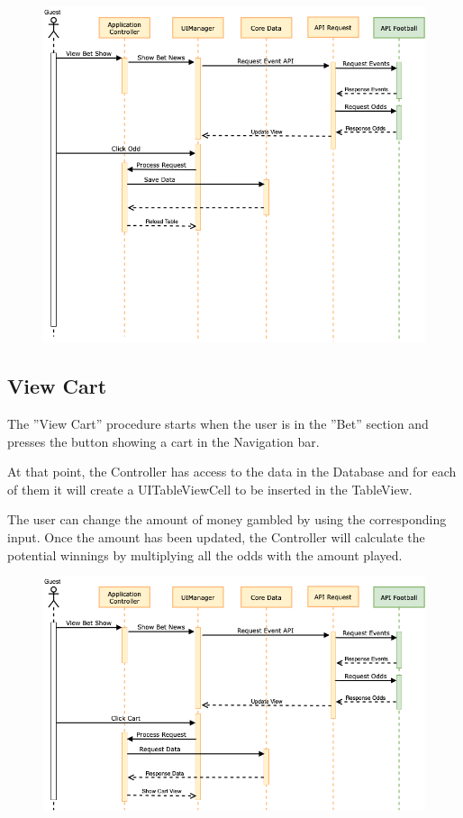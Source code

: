 \documentclass[numbers=noenddot, 12pt, a4paper, oneside]{scrbook}
\begin{document}
\begin{figure}[H]
	\centering
	\includegraphics[width=1\textwidth]{images/Sequence/SequenceAddOdd}
\end{figure}
\newpage
\subsection*{View Cart}
The ”View Cart” procedure starts when the user is in the ”Bet” section and presses the button showing a cart in the Navigation bar.

At  that point, the Controller has access to the data in the Database and for each of them  it will create a UITableViewCell to be inserted in the TableView.

The user can change the amount of money gambled  by using the corresponding  input.  Once the amount has been updated, the Controller will calculate the potential winnings by multiplying all the odds with the amount played.

\begin{figure}[H]
	\centering
	\includegraphics[width=1\textwidth]{images/Sequence/SequenceViewCart}
\end{figure}
\newpage
\end{document}
